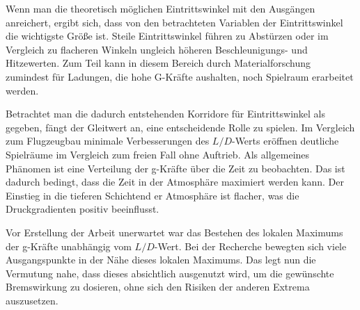 Wenn man die theoretisch möglichen Eintrittswinkel mit den Ausgängen anreichert, ergibt sich, dass von den betrachteten Variablen der Eintrittswinkel die wichtigste Größe ist. Steile Eintrittswinkel führen zu Abstürzen oder im Vergleich zu flacheren Winkeln ungleich höheren Beschleunigungs- und Hitzewerten. Zum Teil kann in diesem Bereich durch Materialforschung zumindest für Ladungen, die hohe G-Kräfte aushalten, noch Spielraum erarbeitet werden.

Betrachtet man die dadurch entstehenden Korridore für Eintrittswinkel als gegeben, fängt der Gleitwert an, eine entscheidende Rolle zu spielen. Im Vergleich zum Flugzeugbau minimale Verbesserungen des $L/D$-Werts eröffnen deutliche Spielräume im Vergleich zum freien Fall ohne Auftrieb. Als allgemeines Phänomen ist eine Verteilung der g-Kräfte über die Zeit zu beobachten. Das ist dadurch bedingt, dass die Zeit in der Atmosphäre maximiert werden kann. Der Einstieg in die tieferen Schichtend er Atmosphäre ist flacher, was die Druckgradienten positiv beeinflusst.

Vor Erstellung der Arbeit unerwartet war das Bestehen des lokalen Maximums der g-Kräfte unabhängig vom $L/D$-Wert. Bei der Recherche bewegten sich viele Ausgangspunkte in der Nähe dieses lokalen Maximums. Das legt nun die Vermutung nahe, dass dieses absichtlich ausgenutzt wird, um die gewünschte Bremswirkung zu dosieren, ohne sich den Risiken der anderen Extrema auszusetzen.